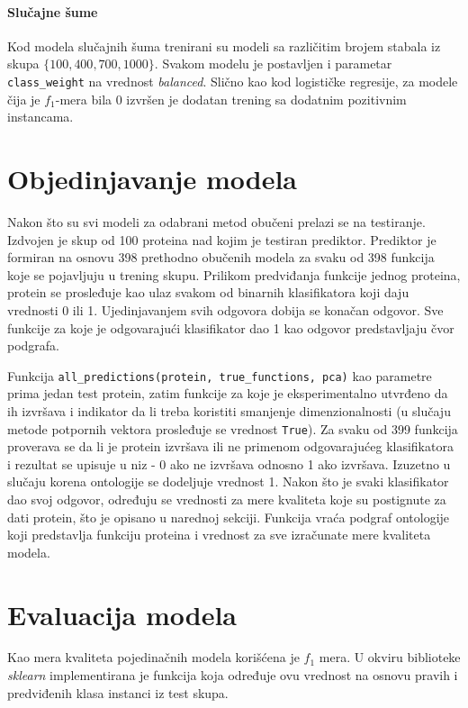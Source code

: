 \paragraph{Slučajne šume}

Kod modela slučajnih šuma trenirani su modeli sa različitim brojem stabala iz skupa $\{100, 400, 700, 1000\}$. Svakom modelu je postavljen i parametar \verb|class_weight| na vrednost \textit{balanced}. Slično kao kod logističke regresije, za modele čija je $f_1$-mera bila 0 izvršen je dodatan trening sa dodatnim pozitivnim instancama.



\section{Objedinjavanje modela}

Nakon što su svi modeli za odabrani metod obučeni prelazi se na testiranje. Izdvojen je skup od 100 proteina nad kojim je testiran prediktor. Prediktor je formiran na osnovu 398 prethodno obučenih modela za svaku od 398 funkcija koje se pojavljuju u trening skupu. Prilikom predviđanja funkcije jednog proteina, protein se prosleđuje kao ulaz svakom od binarnih klasifikatora koji daju vrednosti 0 ili 1. Ujedinjavanjem svih odgovora dobija se konačan odgovor. Sve funkcije za koje je odgovarajući klasifikator dao 1 kao odgovor predstavljaju čvor podgrafa.

Funkcija \verb|all_predictions(protein, true_functions, pca)| kao parametre prima jedan test protein, zatim funkcije za koje je eksperimentalno utvrđeno da ih izvršava i indikator da li treba koristiti smanjenje dimenzionalnosti (u slučaju metode potpornih vektora prosleđuje se vrednost \verb|True|). Za svaku od 399 funkcija proverava se da li je protein izvršava ili ne primenom odgovarajućeg klasifikatora i rezultat se upisuje u niz - 0 ako ne izvršava odnosno 1 ako izvršava. Izuzetno u slučaju korena ontologije se dodeljuje vrednost 1. Nakon što je svaki klasifikator dao svoj odgovor, određuju se vrednosti za mere kvaliteta koje su postignute za dati protein, što je opisano u narednoj sekciji. Funkcija vraća podgraf ontologije koji predstavlja funkciju proteina i vrednost za sve izračunate mere kvaliteta modela.


\section{Evaluacija modela}

Kao mera kvaliteta pojedinačnih modela korišćena je $f_1$ mera. U okviru biblioteke \textit{sklearn} implementirana je funkcija koja određuje ovu vrednost na osnovu pravih i predviđenih klasa instanci iz test skupa. 

